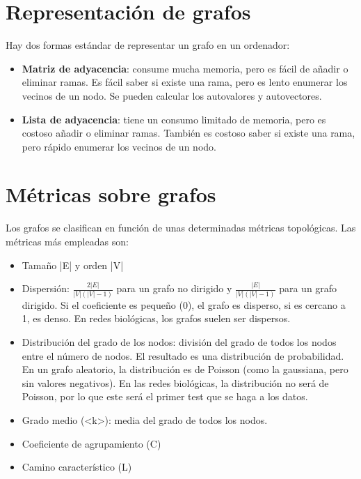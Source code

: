 \section{Representación de grafos}
Hay dos formas estándar de representar un grafo en un ordenador:
\begin{itemize}
\item \textbf{Matriz de adyacencia}: consume mucha memoria, pero es fácil de añadir o eliminar ramas. Es fácil saber si existe una rama, pero es lento enumerar los vecinos de un nodo. Se pueden calcular los autovalores y autovectores.
\item \textbf{Lista de adyacencia}: tiene un consumo limitado de memoria, pero es costoso añadir o eliminar ramas. También es costoso saber si existe una rama, pero rápido enumerar los vecinos de un nodo.
\end{itemize}

\section{Métricas sobre grafos}
Los grafos se clasifican en función de unas determinadas métricas topológicas. Las métricas más empleadas son:
\begin{itemize}
\item Tamaño |E| y orden |V|
\item Dispersión: $\frac{2 |E|}{|V| (|V| - 1)}$ para un grafo no dirigido y $\frac{|E|}{|V| (|V| - 1)}$ para un grafo dirigido. Si el coeficiente es pequeño (0), el grafo es disperso, si es cercano a 1, es denso. En redes biológicas, los grafos suelen ser dispersos.
\item Distribución del grado de los nodos: división del grado de todos los nodos entre el número de nodos. El resultado es una distribución de probabilidad. En un grafo aleatorio, la distribución es de Poisson (como la gaussiana, pero sin valores negativos). En las redes biológicas, la distribución no será de Poisson, por lo que este será el primer test que se haga a los datos. 
\item Grado medio (<k>): media del grado de todos los nodos.
\item Coeficiente de agrupamiento (C)
 \
\item Camino característico (L)
\end{itemize}


